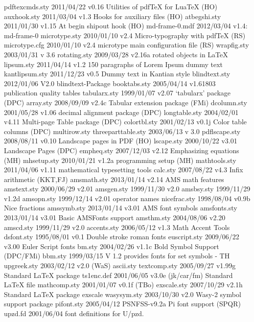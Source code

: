 pdftexcmds.sty    2011/04/22 v0.16 Utilities of pdfTeX for LuaTeX (HO)
 auxhook.sty    2011/03/04 v1.3 Hooks for auxiliary files (HO)
atbegshi.sty    2011/01/30 v1.15 At begin shipout hook (HO)
md-frame-0.mdf    2012/03/04 v1.4: md-frame-0
microtype.sty    2010/01/10 v2.4 Micro-typography with pdfTeX (RS)
microtype.cfg    2010/01/10 v2.4 microtype main configuration file (RS)
 wrapfig.sty    2003/01/31  v 3.6
rotating.sty    2009/03/28 v2.16a rotated objects in LaTeX
  lipsum.sty    2011/04/14 v1.2 150 paragraphs of Lorem Ipsum dummy text
kantlipsum.sty    2011/12/23 v0.5 Dummy text in Kantian style
blindtext.sty    2012/01/06 V2.0 blindtext-Package
booktabs.sty    2005/04/14 v1.61803 publication quality tables
tabularx.sty    1999/01/07 v2.07 `tabularx' package (DPC)
   array.sty    2008/09/09 v2.4c Tabular extension package (FMi)
 dcolumn.sty    2001/05/28 v1.06 decimal alignment package (DPC)
longtable.sty    2004/02/01 v4.11 Multi-page Table package (DPC)
colortbl.sty    2001/02/13 v0.1j Color table columns (DPC)
multirow.sty    
threeparttable.sty    2003/06/13  v 3.0
pdflscape.sty    2008/08/11 v0.10 Landscape pages in PDF (HO)
  lscape.sty    2000/10/22 v3.01 Landscape Pages (DPC)
  empheq.sty    2007/12/03 v2.12 Emphasizing equations (MH)
 mhsetup.sty    2010/01/21 v1.2a programming setup (MH)
mathtools.sty    2011/04/06 v1.11 mathematical typesetting tools
    calc.sty    2007/08/22 v4.3 Infix arithmetic (KKT,FJ)
 amsmath.sty    2013/01/14 v2.14 AMS math features
 amstext.sty    2000/06/29 v2.01
  amsgen.sty    1999/11/30 v2.0
  amsbsy.sty    1999/11/29 v1.2d
  amsopn.sty    1999/12/14 v2.01 operator names
nicefrac.sty    1998/08/04 v0.9b Nice fractions
 amssymb.sty    2013/01/14 v3.01 AMS font symbols
amsfonts.sty    2013/01/14 v3.01 Basic AMSFonts support
  amsthm.sty    2004/08/06 v2.20
   amscd.sty    1999/11/29 v2.0
 accents.sty    2006/05/12 v1.3 Math Accent Tools
  dsfont.sty    1995/08/01 v0.1 Double stroke roman fonts
euscript.sty    2009/06/22 v3.00 Euler Script fonts
      bm.sty    2004/02/26 v1.1c Bold Symbol Support (DPC/FMi)
     bbm.sty    1999/03/15 V 1.2 provides fonts for set symbols - TH
 upgreek.sty    2003/02/12 v2.0 (WaS)
   ascii.sty    
textcomp.sty    2005/09/27 v1.99g Standard LaTeX package
  ts1enc.def    2001/06/05 v3.0e (jk/car/fm) Standard LaTeX file
mathcomp.sty    2001/01/07 v0.1f (TBo)
 exscale.sty    2007/10/29 v2.1h Standard LaTeX package exscale
 wasysym.sty    2003/10/30 v2.0 Wasy-2 symbol support package
  pifont.sty    2005/04/12 PSNFSS-v9.2a Pi font support (SPQR) 
    upzd.fd    2001/06/04 font definitions for U/pzd.
